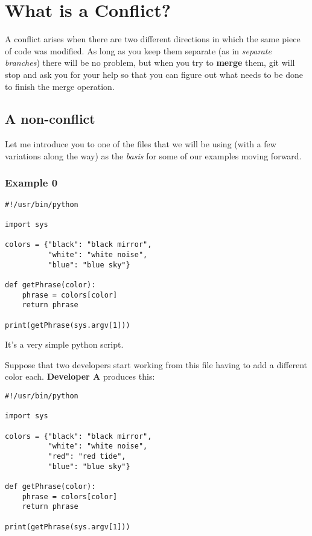 
\section{What is a Conflict?}

A conflict arises when there are two different directions in which the same piece of code was modified. As long as you keep them separate (as in {\it separate branches}) there will be no problem, but when you try to {\bf merge} them, git will stop and ask you for your help so that you can figure out what needs to be done to finish the merge operation.

\subsection{A non-conflict}

Let me introduce you to one of the files that we will be using (with a few variations along the way) as the {\it basis} for some of our examples moving forward.

\subsubsection{Example 0}

\begin{lstlisting}[style=python_style]
#!/usr/bin/python

import sys

colors = {"black": "black mirror",
          "white": "white noise",
          "blue": "blue sky"}

def getPhrase(color):
    phrase = colors[color]
    return phrase

print(getPhrase(sys.argv[1]))
\end{lstlisting}

It's a very simple python script.

Suppose that two developers start working from this file having to add a different color each. {\bf Developer A} produces this:

\begin{lstlisting}[style=python_style]
#!/usr/bin/python

import sys

colors = {"black": "black mirror",
          "white": "white noise",
          "red": "red tide",
          "blue": "blue sky"}

def getPhrase(color):
    phrase = colors[color]
    return phrase

print(getPhrase(sys.argv[1]))
\end{lstlisting}

